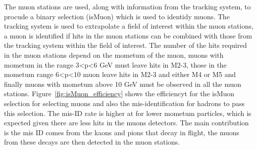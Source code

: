 The muon stations are used, along with information from the tracking system, to procude a binary selection (isMuon) which is used to identidy muons. The tracking system is used to extrapolate a field of interest within the muon stations, a muon is identified if hits in the muon stations can be combined with those from the tracking system within the field of interest. The number of the hits required in the muon stations depend on the mometum of the muon, muons with mometum in the range 3<p<6 GeV must leave hits in M2-3, those in the  mometum range 6<p<10 muon leave hits in M2-3 and either M4 or M5 and finally muons with mometum above 10 GeV must be observed in all the muon stations. Figure~\ref{fig:isMuon_efficiency} shows the efficiencyt for the isMuon selection for selecting muons and also the mis-identification for hadrons to pass this selection. The mis-ID rate is higher at for lower mometum particles, which is expected given there are less hits in the muons detectors. The main contribution is the mis ID comes from the kaons and pions that decay in flight, the  muons from these decays are then detected in the muon stations.





